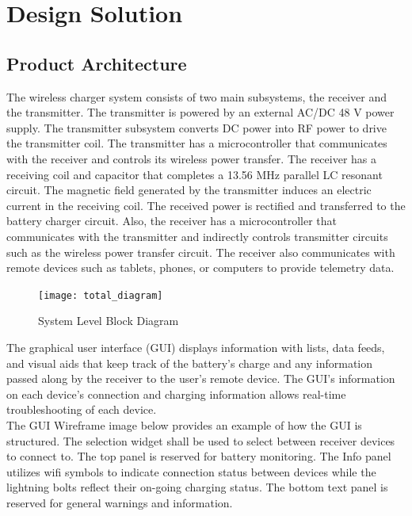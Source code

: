 \documentclass[12pt]{article}
\begin{document}
\pagebreak


\section{Design Solution}

\subsection{Product Architecture}

\indent \indent
The wireless charger system consists of two main subsystems, the receiver and the transmitter.  The transmitter is powered by an external AC/DC 48 V power supply. The transmitter subsystem converts DC power into RF power to drive the transmitter coil. The transmitter has a microcontroller that communicates with the receiver and controls its wireless power transfer.  The receiver has a receiving coil and capacitor that completes a 13.56 MHz parallel LC resonant circuit. The magnetic field generated by the transmitter induces an electric current in the receiving coil. The received power is rectified and transferred to the battery charger circuit. Also, the receiver has a microcontroller that communicates with the transmitter and indirectly controls transmitter circuits such as the wireless power transfer circuit. The receiver also communicates with remote devices such as tablets, phones, or computers to provide telemetry data. \\ 

\hfill
\pagebreak


\begin{figure}[h!]
\centering
\texttt{[image: total\_diagram]}
\caption{System Level Block Diagram}
\end{figure}

\hfill
\pagebreak

The graphical user interface (GUI) displays information with lists, data feeds, and visual aids that keep track of the battery’s charge and any information passed along by the receiver to the user’s remote device.   The GUI’s information on each device’s connection and charging information allows real-time troubleshooting of each device.\\

\indent
The GUI Wireframe image below provides an example of how the GUI is structured.  The selection widget shall be used to select between receiver devices to connect to.  The top panel is reserved for battery monitoring.  The Info panel utilizes wifi symbols to indicate connection status between devices while the lightning bolts reflect their on-going charging status.  The bottom text panel is reserved for general warnings and information.\\
\end{document}
